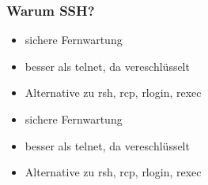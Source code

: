 \begin{frame}
\frametitle{Warum SSH?}
\begin{itemize}
\item sichere Fernwartung
\item besser als telnet, da vereschlüsselt
\item Alternative zu rsh, rcp, rlogin, rexec
\item sichere Fernwartung
\item besser als telnet, da vereschlüsselt
\item Alternative zu rsh, rcp, rlogin, rexec
\end{itemize}
\end{frame}